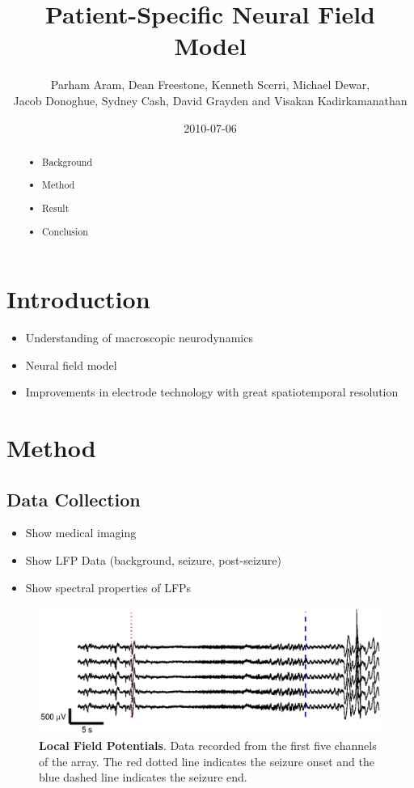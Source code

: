 \documentclass[]{article}
\title{Patient-Specific Neural Field Model}
\author{Parham Aram, Dean Freestone, Kenneth Scerri, Michael Dewar,\\
 Jacob Donoghue, Sydney Cash, David Grayden and Visakan Kadirkamanathan  }
\date{2010-07-06}
\begin{document}
\ifpdf
{}
\else
{}
\fi

\maketitle


\begin{abstract}
	\begin{itemize}
		\item Background
		\item Method
		\item Result
		\item Conclusion
	\end{itemize}
\end{abstract}

\section{Introduction}
\begin{itemize}
	\item Understanding of macroscopic neurodynamics
	\item Neural field model
	\item Improvements in electrode technology with great spatiotemporal resolution
\end{itemize}

\section{Method}

\subsection{Data Collection}
\begin{itemize}
	\item Show medical imaging
	\item Show LFP Data (background, seizure, post-seizure)
	\item Show spectral properties of LFPs
\end{itemize}
\begin{figure}[!ht]
\begin{center}
\includegraphics{./Figures/LFPs.eps}
\end{center}
\caption{{\bf Local Field Potentials}. Data recorded from the first five channels of the array. The red dotted line indicates the seizure onset and the blue dashed line indicates the seizure end.}
\label{fig:SpatialFreqObservation}
\end{figure}
\end{document}
